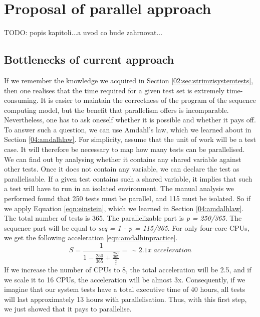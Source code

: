 \chapter{Proposal of parallel approach}

TODO: popis kapitoli...a uvod co bude zahrnovat...

\section{Bottlenecks of current approach}
\label{05:bottlenecks}

If we remember the knowledge we acquired in Section \ref{02:sec:strimzisystemtests}, then one realises that the time required for a given test set is extremely time-consuming. It is easier to maintain the correctness of the program of the sequence computing model, but the benefit that parallelism offers is incomparable. Nevertheless, one has to ask oneself whether it is possible and whether it pays off. To answer such a question, we can use Amdahl's law, which we learned about in Section \ref{04:amdalhlaw}. For simplicity, assume that the unit of work will be a test case. It will therefore be necessary to map how many tests can be parallelised. We can find out by analysing whether it contains any shared variable against other tests. Once it does not contain any variable, we can declare the test as parallelisable. If a given test contains such a shared variable, it implies that such a test will have to run in an isolated environment. The manual analysis we performed found that 250 tests must be parallel, and 115 must be isolated. So if we apply Equation \eqref{eqn:einstein}, which we learned in Section \ref{04:amdalhlaw}. The total number of tests is 365. The parallelizable part is \emph{p = 250/365}. The sequence part will be equal to \emph{seq = 1 - p = 115/365}. For only four-core CPUs, we get the following acceleration \eqref{eqn:amdalhinpractice}.
\begin{equation}
    \label{eqn:amdalhinpractice}
    S = \frac{1}{1 - \frac{250}{365} + \frac{\frac{250}{365}}{\frac{4}{1}}} =\sim 2.1x \; acceleration
    \tag{3}
\end{equation}
If we increase the number of CPUs to 8, the total acceleration will be 2.5, and if we scale it to 16 CPUs, the acceleration will be almost 3x. Consequently, if we imagine that our system tests have a total executive time of 40 hours, all tests will last approximately 13 hours with parallelisation. Thus, with this first step, we just showed that it pays to parallelise.

